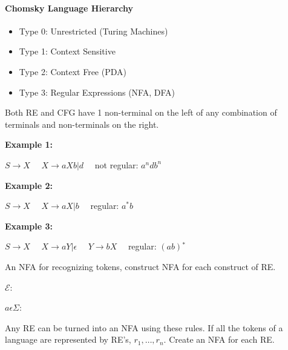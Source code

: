 \documentclass[twocolumn]{article}
\begin{document}
\pagebreak

\paragraph*{Chomsky Language Hierarchy}

\begin{itemize}
  \item Type 0: Unrestricted (Turing Machines)
  \item Type 1: Context Sensitive
  \item Type 2: Context Free (PDA)
  \item Type 3: Regular Expressions (NFA, DFA)
\end{itemize}

Both RE and CFG have 1 non-terminal on the left of any combination of terminals and non-terminals on the right.

\textbf{Example 1:}

$S \to X \quad$
$X \to aXb | d \quad$
\hfill
not regular: $a^n d b^n$

\textbf{Example 2:}

$S \to X \quad$
$X \to aX | b \quad$
\hfill
regular: $a^* b$

\textbf{Example 3:}

$S \to X \quad$
$X \to aY | \epsilon \quad$
$Y \to bX \quad$
\hfill
regular: $(ab){^*}$

An NFA for recognizing tokens, construct NFA for each construct of RE\@.

$\mathcal{E}$:


$a \epsilon \Sigma$:


\pagebreak





Any RE can be turned into an NFA using these rules.
If all the tokens of a language are represented by RE's, $r_1, \dots, r_n$.
Create an NFA for each RE\@.
\end{document}
